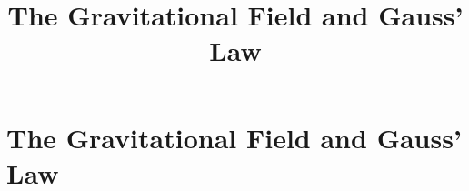 \documentclass[aspectratio=169,
hyperref={colorlinks,urlcolor=blue}
]{beamer}
\begin{document}

\section{The Gravitational Field and Gauss' Law}
\label{sec:gravfieldandgauss}
\title{The Gravitational Field and Gauss' Law}


\begin{frame}
\titlepage
\thispagestyle{empty}
\end{frame}









\end{document}

